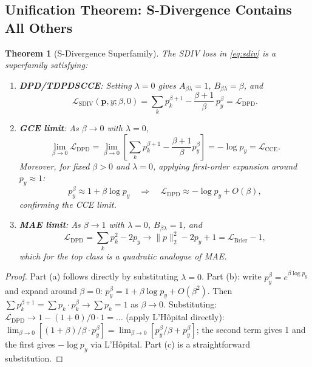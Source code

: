 \documentclass[11pt,a4paper]{article}
\newtheorem{theorem}{Theorem}[section]
\newcommand{\Lcal}{\mathcal{L}}
\newcommand{\py}{p_y}
\newcommand{\pb}{\mathbf{p}}
\newcommand{\Asd}{A_{\beta\lambda}}
\newcommand{\Bsd}{B_{\beta\lambda}}
\begin{document}
\subsection{Unification Theorem: S-Divergence Contains All Others}
\label{sec:unification}

\begin{theorem}[S-Divergence Superfamily]
\label{thm:unification}
The SDIV loss in \cref{eq:sdiv} is a superfamily satisfying:
\begin{enumerate}[label=(\alph*)]
  \item \textbf{DPD/TDPDSCCE}: Setting $\lambda = 0$ gives $\Asd = 1$, $\Bsd = \beta$, and
  \[
    \Lcal_{\mathrm{SDIV}}(\pb,y;\beta,0) = \sum_k p_k^{\beta+1} - \frac{\beta+1}{\beta}\,\py^\beta = \Lcal_{\mathrm{DPD}}.
  \]
  \item \textbf{GCE limit}: As $\beta \to 0$ with $\lambda = 0$,
  \[
    \lim_{\beta\to 0}\Lcal_{\mathrm{DPD}} = \lim_{\beta\to 0}\left[\sum_k p_k^{\beta+1} - \frac{\beta+1}{\beta}\py^\beta\right] = -\log\py = \Lcal_{\mathrm{CCE}}.
  \]
  Moreover, for fixed $\beta > 0$ and $\lambda=0$, applying first-order expansion around $\py \approx 1$:
  \[
    \py^\beta \approx 1 + \beta\log\py \quad\Rightarrow\quad \Lcal_{\mathrm{DPD}} \approx -\log\py + O(\beta),
  \]
  confirming the CCE limit.
  \item \textbf{MAE limit}: As $\beta \to 1$ with $\lambda = 0$, $\Bsd = 1$, and
  \[
    \Lcal_{\mathrm{DPD}} = \sum_k p_k^2 - 2\py \to \|p\|_2^2 - 2\py + 1 = \Lcal_{\mathrm{Brier}} - 1,
  \]
  which for the top class is a quadratic analogue of MAE.
\end{enumerate}
\end{theorem}

\begin{proof}
Part (a) follows directly by substituting $\lambda=0$.
Part (b): write $\py^\beta = e^{\beta\log\py}$ and expand around $\beta=0$:
$\py^\beta = 1 + \beta\log\py + O(\beta^2)$.
Then $\sum p_k^{\beta+1} = \sum p_k \cdot p_k^\beta \to \sum p_k = 1$ as $\beta\to 0$.
Substituting: $\Lcal_{\mathrm{DPD}} \to 1 - (1+0)/0 \cdot 1 = \ldots$ (apply L'Hôpital directly):
$\lim_{\beta\to 0}[(1+\beta)/\beta \cdot p_y^\beta] = \lim_{\beta\to 0}[p_y^\beta/\beta + p_y^\beta]$;
the second term gives 1 and the first gives $-\log p_y$ via L'Hôpital.
Part (c) is a straightforward substitution.
\end{proof}
\end{document}
